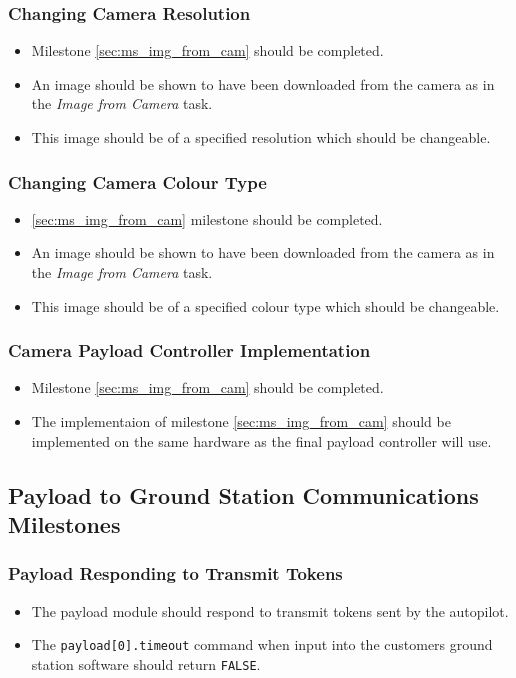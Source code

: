 	\subsubsection{Changing Camera Resolution}
		\label{sec:ms_img_cam_change_res}
		\begin{itemize}
			\item 	Milestone \ref{sec:ms_img_from_cam} should be completed.
			\item 	An image should be shown to have been downloaded 
				from the camera as in the \emph{Image from Camera}
				task.
			\item 	This image should be of a specified resolution which
				should be changeable.
		\end{itemize}

	\subsubsection{Changing Camera Colour Type}
		\label{sec:ms_img_cam_change_colour_type}
		\begin{itemize}
			\item 	\ref{sec:ms_img_from_cam} milestone should be completed.
			\item 	An image should be shown to have been downloaded 
				from the camera as in the \emph{Image from Camera}
				task.
			\item 	This image should be of a specified colour type which
				should be changeable.
		\end{itemize}

	\subsubsection{Camera Payload Controller Implementation}
		\label{sec:ms_img_cam_controller_implementation}
		\begin{itemize}
			\item 	Milestone \ref{sec:ms_img_from_cam} should be completed.
			\item 	The implementaion of milestone \ref{sec:ms_img_from_cam} 
				should be implemented on the same hardware as the final
				payload controller will use.
		\end{itemize}

\subsection{Payload to Ground Station Communications Milestones}
	\subsubsection{Payload Responding to Transmit Tokens}
		\label{sec:ms_pl_tx_token_resp}
		\begin{itemize}
			\item 	The payload module should respond to transmit tokens
				sent by the autopilot. 
			\item 	The \verb+payload[0].timeout+ command when input into
				the customers ground station software should return 
				\verb+FALSE+.
		\end{itemize}

